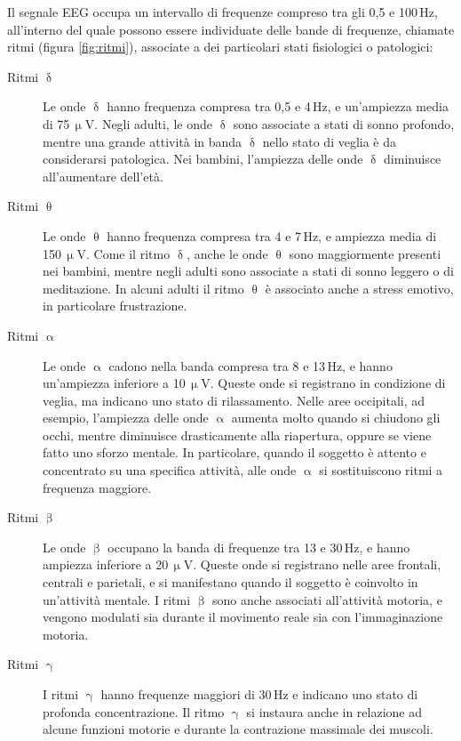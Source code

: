 \documentclass{report}
\newcommand{\figref}[1]{figura \ref{#1}}
\numberwithin{equation}{section}
\numberwithin{figure}{section}
\begin{document}
Il segnale EEG occupa un intervallo di frequenze compreso tra gli 0,5 e 100\,Hz, all'interno del quale possono essere individuate delle bande di frequenze, chiamate ritmi (\figref{fig:ritmi}), associate a dei particolari stati fisiologici o patologici:
\begin{description}
    \item[Ritmi $\updelta$] Le onde $\updelta$ hanno frequenza compresa tra 0,5 e 4\,Hz, e un’ampiezza media di 75\,$\upmu$V. Negli adulti, le onde $\updelta$ sono associate a stati di sonno profondo, mentre una grande attività in banda $\updelta$ nello stato di veglia è da considerarsi patologica. Nei bambini, l’ampiezza delle onde $\updelta$ diminuisce all'aumentare dell'età.
    \item[Ritmi $\uptheta$] Le onde $\uptheta$ hanno frequenza compresa tra 4 e 7\,Hz, e ampiezza media di 150\,$\upmu$V. Come il ritmo $\updelta$, anche le onde $\uptheta$ sono maggiormente presenti nei bambini, mentre negli adulti sono associate a stati di sonno leggero o di meditazione. In alcuni adulti il ritmo $\uptheta$ è associato anche a stress emotivo, in particolare frustrazione.
    \item[Ritmi $\upalpha$] Le onde $\upalpha$ cadono nella banda compresa tra 8 e 13\,Hz, e hanno un’ampiezza inferiore a 10\,$\upmu$V. Queste onde si registrano in condizione di veglia, ma indicano uno stato di rilassamento. Nelle aree occipitali, ad esempio, l’ampiezza delle onde $\upalpha$ aumenta molto quando si chiudono gli occhi, mentre diminuisce drasticamente alla riapertura, oppure se viene fatto uno sforzo mentale. In particolare, quando il soggetto è attento e concentrato su una specifica attività, alle onde $\upalpha$ si sostituiscono ritmi a frequenza maggiore.
    \item[Ritmi $\upbeta$] Le onde $\upbeta$ occupano la banda di frequenze tra 13 e 30\,Hz, e hanno ampiezza inferiore a 20\,$\upmu$V. Queste onde si registrano nelle aree frontali, centrali e parietali, e si manifestano quando il soggetto è coinvolto in un’attività mentale. I ritmi $\upbeta$ sono anche associati all'attività motoria, e vengono modulati sia durante il movimento reale sia con l’immaginazione motoria.
    \item[Ritmi $\upgamma$] I ritmi $\upgamma$ hanno frequenze maggiori di 30\,Hz e indicano uno stato di profonda concentrazione. Il ritmo $\upgamma$ si instaura anche in relazione ad alcune funzioni motorie e durante la contrazione massimale dei muscoli.
\end{description}
\end{document}
